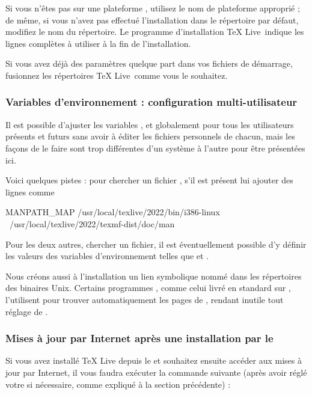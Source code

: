 \documentclass[german, english, french]{article}
\renewcommand{\TL}{\TeX{} Live\xspace}%
\begin{document}
Si vous n'êtes pas sur une plateforme , utilisez le nom de
plateforme approprié ; de même, si vous n'avez pas effectué l'installation dans
le répertoire par défaut, modifiez le nom du répertoire. Le programme
d'installation \TL\ indique les lignes complètes à utiliser à la fin de
l'installation.

Si vous avez déjà des paramètres  quelque part dans vos fichiers
de démarrage, fusionnez les répertoires \TL\ comme vous le souhaitez.

\subsubsection{Variables d'environnement : configuration multi-utilisateur}
\label{sec:envglobal}

Il est possible d'ajuster les variables ,  et
 globalement pour tous les utilisateurs présents et futurs
sans avoir à éditer les fichiers personnels de chacun, mais les façons de le
faire sont trop différentes d'un système à l'autre pour être présentées ici.

Voici quelques pistes : pour  chercher un fichier
, s'il est présent lui ajouter des lignes comme
\begin{sverbatim}
MANPATH_MAP /usr/local/texlive/2022/bin/i386-linux \
            /usr/local/texlive/2022/texmf-dist/doc/man
\end{sverbatim}
Pour les deux autres, chercher un fichier, il est
éventuellement possible d'y définir les valeurs des variables d'environnement
telles que \envname{PATH} et \envname{INFOPATH}.

Nous créons aussi à l'installation un lien symbolique nommé  dans les
répertoires des binaires Unix. Certains programmes , comme celui livré
en standard sur \MacOSX{}, l'utilisent pour trouver automatiquement les pages de
\code{man}, rendant inutile tout réglage de \envname{MANPATH}.

\subsubsection{Mises à jour par Internet après une installation par le
  \protect\DVD}
\label{sec:dvd-install-net-updates}

Si vous avez installé \TL{} depuis le \DVD{} et souhaitez ensuite accéder aux
mises à jour par Internet, il vous faudra exécuter la commande suivante (après
avoir réglé votre \envname{PATH} si nécessaire, comme expliqué à la section
précédente) :
\end{document}
